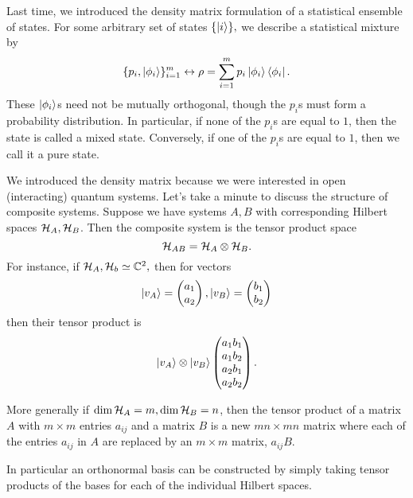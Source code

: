 Last time, we introduced the density matrix formulation of a statistical ensemble of states. For some arbitrary set of states $\{\left| i \right>\},$ we describe a statistical mixture by
\begin{equation}
    \{p_i,\left| \phi_i \right>\}_{i=1}^m \leftrightarrow \rho =\sum_{i=1}^m p_i \left| \phi_i \right>\left< \phi_i \right|.
\end{equation}
These $\left| \phi_i \right>$s need not be mutually orthogonal, though the $p_i$s must form a probability distribution. In particular, if none of the $p_i$s are equal to $1$, then the state is called a mixed state. Conversely, if one of the $p_i$s are equal to $1$, then we call it a pure state.

We introduced the density matrix because we were interested in open (interacting) quantum systems. Let's take a minute to discuss the structure of composite systems. Suppose we have systems $A,B$ with corresponding Hilbert spaces $\mathcal H_A,\mathcal H_B$. Then the composite system is the tensor product space
\begin{equation}
    \mathcal H_{AB}=\mathcal H_{A} \otimes \mathcal H_B.
\end{equation}
For instance, if $\mathcal H_A,\mathcal H_b \simeq \mathbb{C}^2,$ then for vectors
\begin{equation*}
    \left| v_A \right>=\begin{pmatrix} a_1 \\ a_2
    \end{pmatrix},
    \left| v_B \right>=\begin{pmatrix} b_1 \\ b_2
    \end{pmatrix}
\end{equation*}
then their tensor product is
\begin{equation*}
    \left| v_A \right>\otimes \left| v_B \right> \begin{pmatrix} a_1b_1 \\ a_1 b_2 \\ a_2b_1 \\ a_2b_2
    \end{pmatrix}.
\end{equation*}

More generally if $\dim \mathcal H_A =m, \dim\mathcal H_B=n$, then the tensor product of a matrix $A$ with $m\times m$ entries $a_{ij}$ and a matrix $B$ is a new $mn\times mn$ matrix where each of the entries $a_{ij}$ in $A$ are replaced by an $m\times m$ matrix, $a_{ij} B$.

In particular an orthonormal basis can be constructed by simply taking tensor products of the bases for each of the individual Hilbert spaces.

